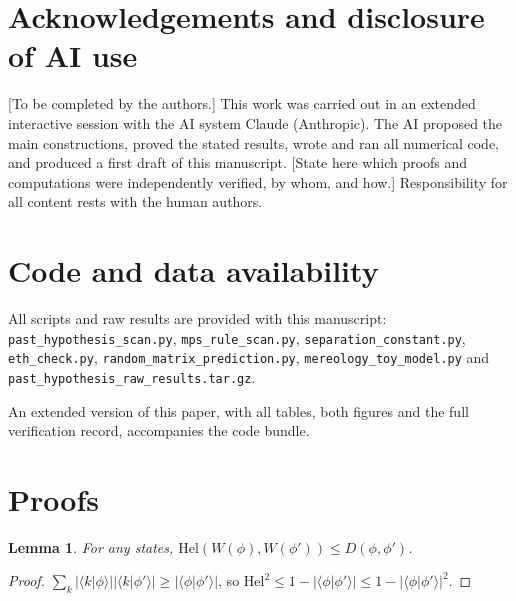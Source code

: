\documentclass[11pt]{article}
\newtheorem{lemma}[theorem]{Lemma}
\theoremstyle{definition}
\theoremstyle{remark}
\newcommand{\braket}[2]{\langle #1|#2\rangle}
\newcommand{\Hel}{\mathrm{Hel}}
\begin{document}
\section*{Acknowledgements and disclosure of AI use}
[To be completed by the authors.] This work was carried out in an extended interactive session with the AI system Claude (Anthropic). The AI proposed the main constructions, proved the stated results, wrote and ran all numerical code, and produced a first draft of this manuscript. [State here which proofs and computations were independently verified, by whom, and how.] Responsibility for all content rests with the human authors.

\section*{Code and data availability}\sloppy
All scripts and raw results are provided with this manuscript: \texttt{past\_hypothesis\_scan.py}, \texttt{mps\_rule\_scan.py}, \texttt{separation\_constant.py}, \texttt{eth\_check.py}, \texttt{random\_matrix\_prediction.py}, \texttt{mereology\_toy\_model.py} and \texttt{past\_hypothesis\_raw\_results.tar.gz}.

\noindent An extended version of this paper, with all tables, both figures and the full verification record, accompanies the code bundle.

\appendix
\section{Proofs}
\label{app:proofs}

\begin{lemma}\label{lem:helD}
For any states, $\Hel(W(\phi),W(\phi'))\le D(\phi,\phi')$.
\end{lemma}
\begin{proof}
$\sum_k|\braket{k}{\phi}||\braket{k}{\phi'}|\ge|\braket{\phi}{\phi'}|$, so $\Hel^2\le1-|\braket{\phi}{\phi'}|\le1-|\braket{\phi}{\phi'}|^2$.
\end{proof}
\end{document}
